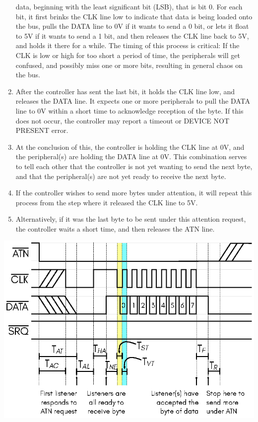 \begin{enumerate}
  data, beginning with the least significant bit (LSB), that is bit
  0. For each bit, it first brinks the CLK line low to indicate that
  data is being loaded onto the bus, pulls the DATA line to 0V if it
  wants to send a 0 bit, or lets it float to 5V if it wants to send
  a 1 bit, and then releases the CLK line back to 5V, and holds it
  there for a while.  The timing of this process is critical: If the
  CLK is low or high for too short a period of time, the peripherals
  will get confused, and possibly miss one or more bits, resulting
  in general chaos on the bus.
\item After the controller has sent the last bit, it holds the CLK
  line low, and releases the DATA line. It expects one or more
  peripherals to pull the DATA line to 0V within a short time to
  acknowledge reception of the byte. If this does not occur, the
  controller may report a timeout or DEVICE NOT PRESENT error.
\item At the conclusion of this, the controller is holding the
  CLK line at 0V, and the peripheral(s) are holding the DATA
  line at 0V. This combination serves to tell each other that
  the controller is not yet wanting to send the next byte, and
  that the peripheral(s) are not yet ready to receive the next
  byte.
\item If the controller wishes to send more bytes under
  attention, it will repeat this process from the step where
  it released the CLK line to 5V.
\item Alternatively, if it was the last byte to be sent
  under this attention request, the controller waits a short
  time, and then releases the ATN line.
\end{enumerate}

\begin{center}
\includegraphics{images/IEC-Timing-Diagrams/IEC-Timing-Diagram-ATN-Send-Byte}
\end{center}

